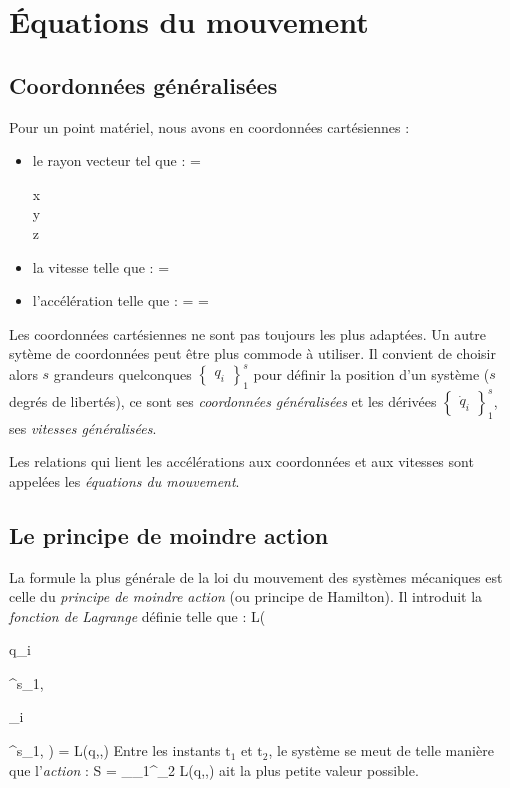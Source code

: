 \chapter{\'Equations du mouvement}
\section{Coordonn\'ees g\'en\'eralis\'ees}

Pour un point mat\'eriel, nous avons en coordonn\'ees cart\'esiennes :
\begin{itemize}
\item le rayon vecteur tel que :
	\be
		 = \begin{pmatrix} x \\ y \\ z \end{pmatrix}
	\ee
\item la vitesse telle que :
	\be
		 = 
	\ee
\item l'acc\'el\'eration telle que :
	\be
		 =  = 
	\ee
\end{itemize}

Les coordonn\'ees cart\'esiennes ne sont pas toujours les plus adapt\'ees. Un autre syt\`eme de coordonn\'ees peut \^etre plus commode \`a utiliser. Il convient de choisir alors $s$ grandeurs quelconques $\begin{Bmatrix}q_{i}\end{Bmatrix}^{s}_{1}$ pour d\'efinir la position d'un syst\`eme ($s$ degr\'es de libert\'es), ce sont ses \emph{coordonn\'ees g\'en\'eralis\'ees} et les d\'eriv\'ees $\begin{Bmatrix}\dot{q}_{i}\end{Bmatrix}^{s}_{1}$, ses \emph{vitesses g\'en\'eralis\'ees}.

Les relations qui lient les acc\'el\'erations aux coordonn\'ees et aux vitesses sont appel\'ees les \emph{\'equations du mouvement}.

\section{Le principe de moindre action}

La formule la plus g\'en\'erale de la loi du mouvement des syst\`emes mécaniques est celle du \emph{principe de moindre action} (ou principe de Hamilton). Il introduit la \emph{fonction de Lagrange} d\'efinie telle que :
\be
	L(\begin{Bmatrix}q_{i}\end{Bmatrix}^{s}_{1},\begin{Bmatrix}_{i}\end{Bmatrix}^{s}_{1}, ) = L(q,,)
\ee
Entre les instants $\mathrm{t}_{1}$ et $\mathrm{t}_{2}$, le système se meut de telle mani\`ere que l'\emph{action} :
\be
	S = \int_{_{1}}^{_{2}} L(q,,)  \label{EQ:2_1}
\ee
ait la plus petite valeur possible.

